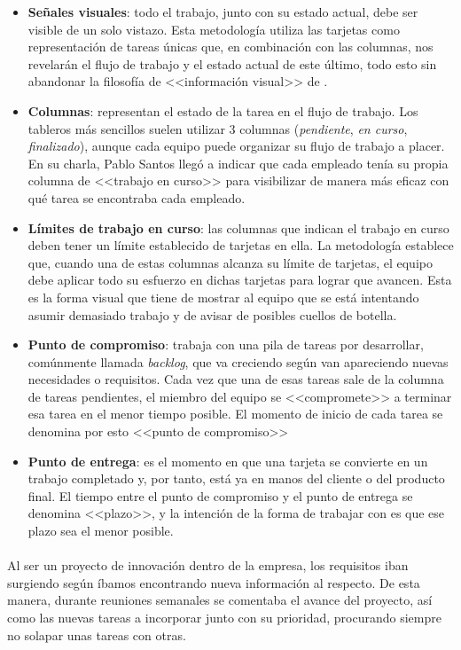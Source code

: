 \documentclass{subfiles}
\begin{document}
        \begin{itemize}
            \item {\textbf{Señales visuales}: todo el trabajo, junto con su estado actual, debe ser visible de un solo vistazo. Esta metodología utiliza las tarjetas como representación de tareas únicas que, en combinación con las columnas, nos revelarán el flujo de trabajo y el estado actual de este último, todo esto sin abandonar la filosofía de <<información visual>> de \Kanban.}
            \item {\textbf{Columnas}: representan el estado de la tarea en el flujo de trabajo. Los tableros más sencillos suelen utilizar 3 columnas (\textit{pendiente}, \textit{en curso}, \textit{finalizado}), aunque cada equipo puede organizar su flujo de trabajo a placer. En su charla, Pablo Santos llegó a indicar que cada empleado tenía su propia columna de <<trabajo en curso>> para visibilizar de manera más eficaz con qué tarea se encontraba cada empleado.}
            \item {\textbf{Límites de trabajo en curso}: las columnas que indican el trabajo en curso deben tener un límite establecido de tarjetas en ella. La metodología establece que, cuando una de estas columnas alcanza su límite de tarjetas, el equipo debe aplicar todo su esfuerzo en dichas tarjetas para lograr que avancen. Esta es la forma visual que tiene \Kanban de mostrar al equipo que se está intentando asumir demasiado trabajo y de avisar de posibles cuellos de botella.}
            \item {\textbf{Punto de compromiso}: \Kanban trabaja con una pila de tareas por desarrollar, comúnmente llamada \textit{backlog}, que va creciendo según van apareciendo nuevas necesidades o requisitos. Cada vez que una de esas tareas sale de la columna de tareas pendientes, el miembro del equipo se <<compromete>> a terminar esa tarea en el menor tiempo posible. El momento de inicio de cada tarea se denomina por esto <<punto de compromiso>>}
            \item {\textbf{Punto de entrega}: es el momento en que una tarjeta se convierte en un trabajo completado y, por tanto, está ya en manos del cliente o del producto final. El tiempo entre el punto de compromiso y el punto de entrega se denomina <<plazo>>, y la intención de la forma de trabajar con \Kanban es que ese plazo sea el menor posible.}
        \end{itemize}
        
        \paragraph{}
        {Al ser un proyecto de innovación dentro de la empresa, los requisitos iban surgiendo según íbamos encontrando nueva información al respecto. De esta manera, durante reuniones semanales se comentaba el avance del proyecto, así como las nuevas tareas a incorporar junto con su prioridad, procurando siempre no solapar unas tareas con otras.}
\end{document}
